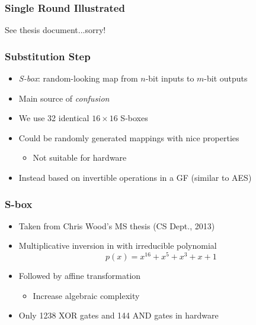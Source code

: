 \begin{frame}
\frametitle{Single Round Illustrated}
\vfill
\begin{center}
\Large
See thesis document...sorry!
\end{center}
\vfill
\end{frame}

\begin{frame}
\frametitle{Substitution Step}
\begin{itemize}
  \item \emph{S-box}: random-looking map from $n$-bit inputs to $m$-bit outputs
  \item Main source of \emph{confusion} 
  \item We use 32 identical $16 \times 16$ S-boxes
  \item Could be randomly generated mappings with nice properties
  \begin{itemize}
    \item Not suitable for hardware
  \end{itemize}
  \item Instead based on invertible operations in a GF (similar to AES)
\end{itemize}
\end{frame}

\begin{frame}
\frametitle{S-box}
\begin{itemize}
  \item Taken from Chris Wood's MS thesis (CS Dept., 2013) \cite{Wood2013_SboxThesis}
  \item Multiplicative inversion in \gfsixteen with irreducible polynomial
  \begin{equation*}
    p(x) = x^{16} + x^5 + x^3 + x + 1
  \end{equation*} 
  \item Followed by affine transformation
  \begin{itemize}
    \item Increase algebraic complexity
  \end{itemize}
  \item Only 1238 XOR gates and 144 AND gates in hardware
\end{itemize}
\end{frame}

